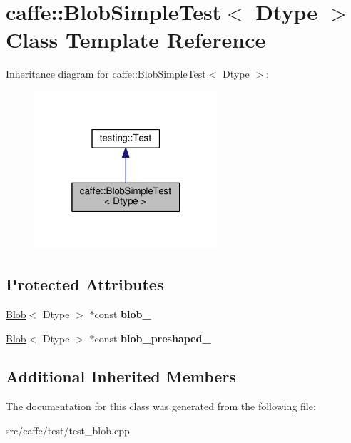 \hypertarget{classcaffe_1_1_blob_simple_test}{}\section{caffe\+:\+:Blob\+Simple\+Test$<$ Dtype $>$ Class Template Reference}
\label{classcaffe_1_1_blob_simple_test}


Inheritance diagram for caffe\+:\+:Blob\+Simple\+Test$<$ Dtype $>$\+:
\nopagebreak
\begin{figure}[H]
\begin{center}
\leavevmode
\includegraphics[width=193pt]{classcaffe_1_1_blob_simple_test__inherit__graph}
\end{center}
\end{figure}
\subsection*{Protected Attributes}
\begin{DoxyCompactItemize}
\item 
\mbox{\label{classcaffe_1_1_blob_simple_test_a3e468873646ed610428bf0736e848fdd}} 
\mbox{\hyperlink{classcaffe_1_1_blob}{Blob}}$<$ Dtype $>$ $\ast$const {\bfseries blob\+\_\+}
\item 
\mbox{\label{classcaffe_1_1_blob_simple_test_a3614f695be135a4414285ce66bc67a20}} 
\mbox{\hyperlink{classcaffe_1_1_blob}{Blob}}$<$ Dtype $>$ $\ast$const {\bfseries blob\+\_\+preshaped\+\_\+}
\end{DoxyCompactItemize}
\subsection*{Additional Inherited Members}


The documentation for this class was generated from the following file\+:\begin{DoxyCompactItemize}
\item 
src/caffe/test/test\+\_\+blob.\+cpp\end{DoxyCompactItemize}
